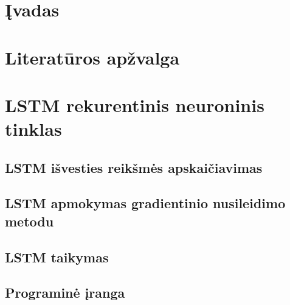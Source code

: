 \documentclass{ktu_phd_summary}
\begin{document}








\tableofcontents
\clearpage

\listoffigures
\clearpage

\listoftables
\clearpage

\section*{Įvadas}


\clearpage

\section{Literatūros apžvalga}


\clearpage



\section{LSTM rekurentinis neuroninis tinklas}




\subsection{LSTM išvesties reikšmės apskaičiavimas}


\subsection{LSTM apmokymas gradientinio nusileidimo metodu}


\subsection{LSTM taikymas}


\subsection{Programinė įranga}

\end{document}
